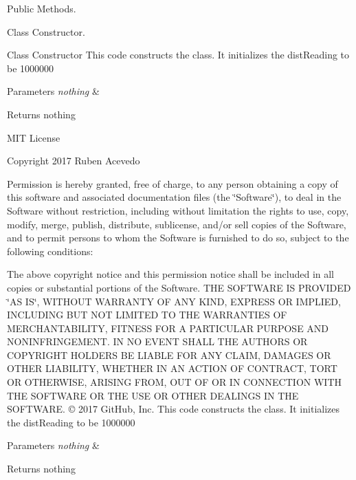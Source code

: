 Public Methods. 

Class Constructor.

Class Constructor This code constructs the class. It initializes the dist\+Reading to be 1000000 
\begin{DoxyParams}{Parameters}
{\em nothing} & \\
\hline
\end{DoxyParams}
\begin{DoxyReturn}{Returns}
nothing
\end{DoxyReturn}
M\+IT License

Copyright 2017 Ruben Acevedo

Permission is hereby granted, free of charge, to any person obtaining a copy of this software and associated documentation files (the \char`\"{}\+Software\char`\"{}), to deal in the Software without restriction, including without limitation the rights to use, copy, modify, merge, publish, distribute, sublicense, and/or sell copies of the Software, and to permit persons to whom the Software is furnished to do so, subject to the following conditions\+:

The above copyright notice and this permission notice shall be included in all copies or substantial portions of the Software. T\+HE S\+O\+F\+T\+W\+A\+RE IS P\+R\+O\+V\+I\+D\+ED \char`\"{}\+A\+S I\+S\char`\"{}, W\+I\+T\+H\+O\+UT W\+A\+R\+R\+A\+N\+TY OF A\+NY K\+I\+ND, E\+X\+P\+R\+E\+SS OR I\+M\+P\+L\+I\+ED, I\+N\+C\+L\+U\+D\+I\+NG B\+UT N\+OT L\+I\+M\+I\+T\+ED TO T\+HE W\+A\+R\+R\+A\+N\+T\+I\+ES OF M\+E\+R\+C\+H\+A\+N\+T\+A\+B\+I\+L\+I\+TY, F\+I\+T\+N\+E\+SS F\+OR A P\+A\+R\+T\+I\+C\+U\+L\+AR P\+U\+R\+P\+O\+SE A\+ND N\+O\+N\+I\+N\+F\+R\+I\+N\+G\+E\+M\+E\+NT. IN NO E\+V\+E\+NT S\+H\+A\+LL T\+HE A\+U\+T\+H\+O\+RS OR C\+O\+P\+Y\+R\+I\+G\+HT H\+O\+L\+D\+E\+RS BE L\+I\+A\+B\+LE F\+OR A\+NY C\+L\+A\+IM, D\+A\+M\+A\+G\+ES OR O\+T\+H\+ER L\+I\+A\+B\+I\+L\+I\+TY, W\+H\+E\+T\+H\+ER IN AN A\+C\+T\+I\+ON OF C\+O\+N\+T\+R\+A\+CT, T\+O\+RT OR O\+T\+H\+E\+R\+W\+I\+SE, A\+R\+I\+S\+I\+NG F\+R\+OM, O\+UT OF OR IN C\+O\+N\+N\+E\+C\+T\+I\+ON W\+I\+TH T\+HE S\+O\+F\+T\+W\+A\+RE OR T\+HE U\+SE OR O\+T\+H\+ER D\+E\+A\+L\+I\+N\+GS IN T\+HE S\+O\+F\+T\+W\+A\+RE. © 2017 Git\+Hub, Inc. This code constructs the class. It initializes the dist\+Reading to be 1000000 
\begin{DoxyParams}{Parameters}
{\em nothing} & \\
\hline
\end{DoxyParams}
\begin{DoxyReturn}{Returns}
nothing 
\end{DoxyReturn}


